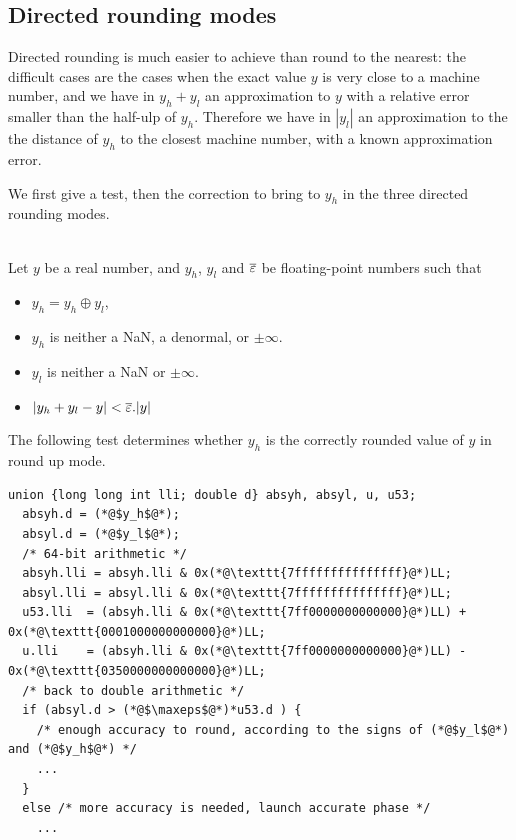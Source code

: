 \subsection{Directed rounding modes}

Directed rounding is much easier to achieve than round to the nearest:
the difficult cases are the cases when the exact value $y$ is very
close to a machine number, and we have in $y_h+y_l$ an approximation to
$y$ with a relative error smaller than the half-ulp of $y_h$.
Therefore we have in $|y_l|$ an approximation to the the distance of
$y_h$ to the closest machine number, with a known approximation error.

We first give a test, then the correction to bring to $y_h$ in the
three directed rounding modes.
\begin{theorem}
\label{th:roundingDirected}
~\\
Let $y$ be a real number, and $y_h$, $y_l$ and ${\overline{\varepsilon}}$ be
floating-point numbers such that
  \begin{itemize}
  \item $y_h=y_h\oplus y_l$,
  \item $y_h$ is neither a NaN, a denormal, or $\pm \infty$.
  \item $y_l$ is neither a NaN or $\pm \infty$.
  \item $|y_h+y_l - y| <{\overline{\varepsilon}}.|y|$
\end{itemize}

The following test determines whether $y_h$ is the
  correctly rounded value of $y$ in round up mode.

\begin{lstlisting}[caption={Test for directed rounding},
  firstnumber=1]
  union {long long int lli; double d} absyh, absyl, u, u53;
  absyh.d = (*@$y_h$@*);
  absyl.d = (*@$y_l$@*);
  /* 64-bit arithmetic */
  absyh.lli = absyh.lli & 0x(*@\texttt{7fffffffffffffff}@*)LL;
  absyl.lli = absyl.lli & 0x(*@\texttt{7fffffffffffffff}@*)LL;
  u53.lli  = (absyh.lli & 0x(*@\texttt{7ff0000000000000}@*)LL) + 0x(*@\texttt{0001000000000000}@*)LL;
  u.lli    = (absyh.lli & 0x(*@\texttt{7ff0000000000000}@*)LL) - 0x(*@\texttt{0350000000000000}@*)LL;
  /* back to double arithmetic */
  if (absyl.d > (*@$\maxeps$@*)*u53.d ) {
    /* enough accuracy to round, according to the signs of (*@$y_l$@*) and (*@$y_h$@*) */
    ...
  }
  else /* more accuracy is needed, launch accurate phase */
    ...
\end{lstlisting}
\end{theorem}

